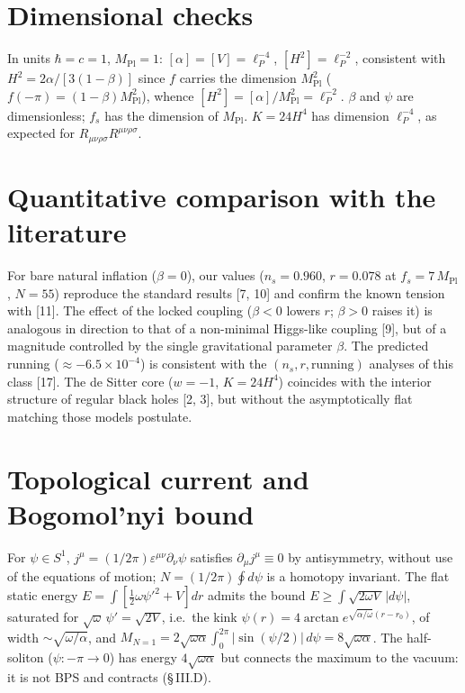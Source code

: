 \documentclass[11pt,a4paper]{article}
\newcommand{\Mpl}{M_{\mathrm{Pl}}}
\theoremstyle{plain}
\theoremstyle{remark}
\begin{document}
\section{Dimensional checks}
In units $\hbar=c=1$, $\Mpl=1$: $[\alpha]=[V]=\ell_P^{-4}$, $[H^2]=\ell_P^{-2}$, consistent
with $H^2=2\alpha/[3(1-\beta)]$ since $f$ carries the dimension $\Mpl^2$
($f(-\pi)=(1-\beta)\Mpl^2$), whence $[H^2]=[\alpha]/\Mpl^2=\ell_P^{-2}$. $\beta$ and $\psi$
are dimensionless; $f_s$ has the dimension of $\Mpl$. $K=24H^4$ has dimension $\ell_P^{-4}$,
as expected for $R_{\mu\nu\rho\sigma}R^{\mu\nu\rho\sigma}$.

\section{Quantitative comparison with the literature}
For bare natural inflation ($\beta=0$), our values ($n_s=0.960$, $r=0.078$ at $f_s=7\,\Mpl$,
$N=55$) reproduce the standard results [7, 10] and confirm the known tension with [11]. The
effect of the locked coupling ($\beta<0$ lowers $r$; $\beta>0$ raises it) is analogous in
direction to that of a non-minimal Higgs-like coupling [9], but of a magnitude controlled by
the single gravitational parameter $\beta$. The predicted running ($\approx-6.5\times10^{-4}$)
is consistent with the $(n_s,r,\text{running})$ analyses of this class [17]. The de Sitter
core ($w=-1$, $K=24H^4$) coincides with the interior structure of regular black holes [2, 3],
but without the asymptotically flat matching those models postulate.

\section{Topological current and Bogomol'nyi bound}
For $\psi\in S^1$, $j^\mu=(1/2\pi)\varepsilon^{\mu\nu}\partial_\nu\psi$ satisfies
$\partial_\mu j^\mu\equiv0$ by antisymmetry, without use of the equations of motion;
$N=(1/2\pi)\oint d\psi$ is a homotopy invariant. The flat static energy
$E=\int[\tfrac12\omega\psi'^2+V]dr$ admits the bound $E\ge\int\sqrt{2\omega V}\,|d\psi|$,
saturated for $\sqrt\omega\,\psi'=\sqrt{2V}$, i.e.\ the kink
$\psi(r)=4\arctan e^{\sqrt{\alpha/\omega}(r-r_0)}$, of width $\sim\sqrt{\omega/\alpha}$, and
$M_{N=1}=2\sqrt{\omega\alpha}\int_0^{2\pi}|\sin(\psi/2)|\,d\psi=8\sqrt{\omega\alpha}$. The
half-soliton ($\psi:-\pi\to0$) has energy $4\sqrt{\omega\alpha}$ but connects the maximum to
the vacuum: it is not BPS and contracts (\S\,III.D).

\end{document}
